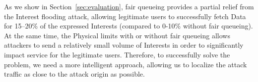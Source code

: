 As we show in Section~\ref{sec:evaluation}, fair queueing provides a partial relief from the Interest flooding attack, allowing legitimate users to successfully fetch Data for 15--20\% of the expressed Interests (compared to 0-10\% without fair queueing).
At the same time, the Physical limits with or without fair queueing allows attackers to send a relatively small volume of Interests in order to significantly impact service for the legitimate users.
Therefore, to successfully solve the problem, we need a more intelligent approach, allowing us to localize the attack traffic as close to the attack origin as possible.

